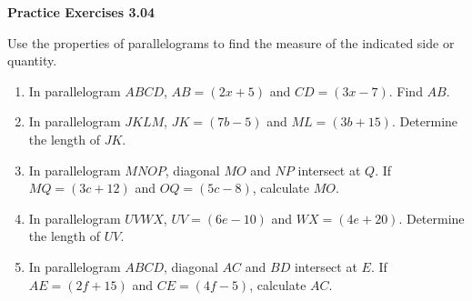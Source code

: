 \vspace{0.3ex}
\noindent\textbf{Practice Exercises 3.04}

\vspace{0.2ex}

\noindent Use the properties of parallelograms to find the measure of the indicated side or quantity.

\begin{enumerate}[label=\color{blue}\arabic*.]
    \item In parallelogram \(ABCD\), \(AB = (2x + 5)\) and \(CD = (3x - 7)\). Find \(AB\).
    \item In parallelogram \(JKLM\), \(JK = (7b - 5)\) and \(ML = (3b + 15)\). Determine the length of \(JK\).
    \item In parallelogram \(MNOP\), diagonal \(MO\) and \(NP\) intersect at \(Q\). If \(MQ = (3c + 12)\) and \(OQ = (5c - 8)\), calculate \(MO\).
    \item In parallelogram \(UVWX\), \(UV = (6e - 10)\) and \(WX = (4e + 20)\). Determine the length of \(UV\).
    \item In parallelogram \(ABCD\), diagonal \(AC\) and \(BD\) intersect at \(E\). If \(AE = (2f + 15)\) and \(CE = (4f - 5)\), calculate \(AC\).
\end{enumerate}
